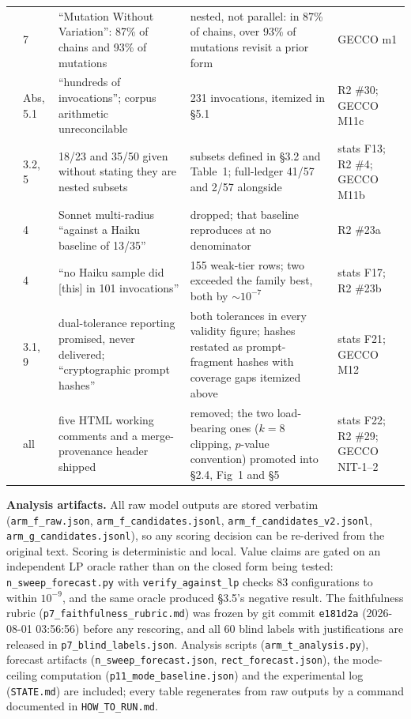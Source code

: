 \documentclass[11pt]{article}
\begin{document}
\begin{longtable}{L{0.4cm}L{1.0cm}L{4.1cm}L{6.4cm}L{1.8cm}}
 & 7 & ``Mutation Without Variation'': 87\% of chains and 93\% of mutations & nested, not parallel: in 87\% of chains, over 93\% of mutations revisit a prior form & GECCO m1 \\
 & Abs, 5.1 & ``hundreds of invocations''; corpus arithmetic unreconcilable & 231 invocations, itemized in \S5.1 & R2 \#30; GECCO M11c \\
 & 3.2, 5 & 18/23 and 35/50 given without stating they are nested subsets & subsets defined in \S3.2 and Table~1; full-ledger 41/57 and 2/57 alongside & stats F13; R2 \#4; GECCO M11b \\
 & 4 & Sonnet multi-radius ``against a Haiku baseline of 13/35'' & dropped; that baseline reproduces at no denominator & R2 \#23a \\
 & 4 & ``no Haiku sample did [this] in 101 invocations'' & 155 weak-tier rows; two exceeded the family best, both by ${\sim}10^{-7}$ & stats F17; R2 \#23b \\
 & 3.1, 9 & dual-tolerance reporting promised, never delivered; ``cryptographic prompt hashes'' & both tolerances in every validity figure; hashes restated as prompt-fragment hashes with coverage gaps itemized above & stats F21; GECCO M12 \\
 & all & five HTML working comments and a merge-provenance header shipped & removed; the two load-bearing ones ($k = 8$ clipping, $p$-value convention) promoted into \S2.4, Fig~1 and \S5 & stats F22; R2 \#29; GECCO NIT-1--2 \\
\end{longtable}
\endgroup

\textbf{Analysis artifacts.} All raw model outputs are stored verbatim (\texttt{arm\_f\_raw.json},
\texttt{arm\_f\_candidates.jsonl}, \texttt{arm\_f\_candidates\_v2.jsonl}, \texttt{arm\_g\_candidates.jsonl}), so any scoring
decision can be re-derived from the original text. Scoring is deterministic and local. Value
claims are gated on an independent LP oracle rather than on the closed form being tested:
\texttt{n\_sweep\_forecast.py} with \texttt{verify\_against\_lp} checks 83 configurations to within $10^{-9}$, and the
same oracle produced \S3.5's negative result. The faithfulness rubric
(\texttt{p7\_faithfulness\_rubric.md}) was frozen by git commit \texttt{e181d2a} (2026-08-01 03:56:56) before
any rescoring, and all 60 blind labels with justifications are released in
\texttt{p7\_blind\_labels.json}. Analysis scripts (\texttt{arm\_t\_analysis.py}), forecast artifacts
(\texttt{n\_sweep\_forecast.json}, \texttt{rect\_forecast.json}), the mode-ceiling computation
(\texttt{p11\_mode\_baseline.json}) and the experimental log (\texttt{STATE.md}) are included; every table
regenerates from raw outputs by a command documented in \texttt{HOW\_TO\_RUN.md}.
\end{document}
